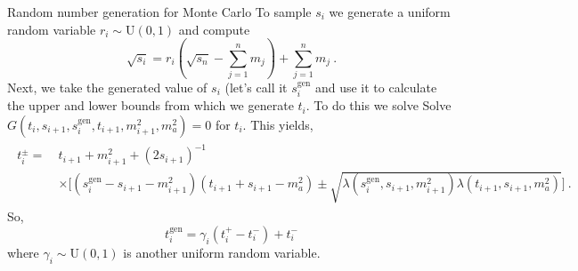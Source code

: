 
\newpage
\begin{bluenv}{Random number generation for Monte Carlo}
    To sample $s_i$ we generate a uniform random variable $r_i \sim \mathrm{U}(0,1)$ and compute
    \begin{equation}
        \sqrt{s_i} = r_i \left(\sqrt{s_n} - \sum_{j=1}^{n} m_j\right) + \sum_{j=1}^{n} m_j\ .
    \end{equation}
    Next, we take the generated value of $s_i$ (let's call it $s_i^{\mathrm{gen}}$ and use it to calculate the upper and lower bounds from which we generate $t_i$.
    To do this we solve
    Solve $G(t_{i}, s_{i+1}, s_{i}^\mathrm{gen}, t_{i+1}, m_{i+1}^2, m_a^2) = 0$ for $t_{i}$. 
    This yields,
    \begin{gather}
        \begin{aligned}
            t_{i}^{\pm} 
            =\ 
            &t_{i+1} + m_{i+1}^2 + (2 s_{i+1})^{-1} \\
            & \times
            \bigl[
                (s_{i}^\mathrm{gen} - s_{i+1} - m_{i+1}^2)(t_{i+1} + s_{i+1} - m_a^2) \pm \sqrt{\lambda(s_{i}^\mathrm{gen}, s_{i+1}, m_{i+1}^2)\lambda(t_{i+1},s_{i+1},m_a^2)}
            \bigr] \ .
        \end{aligned} 
    \end{gather}
    So,
    \begin{equation}
        t_i^{\mathrm{gen}} = \gamma_i (t_i^+ - t_i^-) + t_i^-
    \end{equation}
    where $\gamma_i \sim \mathrm{U}(0,1)$ is another uniform random variable. 
\end{bluenv}

